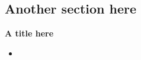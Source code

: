 \documentclass[a0,portrait]{a0poster}
\begin{document}
\noindent\makebox[\linewidth]{\rule{\linewidth}{5.6pt}}

\begin{multicols}{3}\setlength{\columnseprule}{0pt}
\section*{Another section here}
\begin{center}
\end{center}%

\begin{center}
\end{center}


\begin{tcolorbox}[colback=mblue!5!white]
\Large \textbf{A title here}
\begin{itemize}
\item
\end{itemize}
\end{tcolorbox}

\end{multicols}
\end{document}
